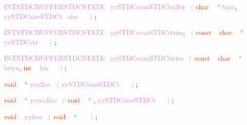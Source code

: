 \documentclass[8, usernames, dvipsnames]{beamer}
\begin{document}
\begin{frame}

 \textcolor{Violet}{INTSTDCBUFFERSTDCSTATE}\textcolor{White}{\ }
\textcolor{Violet}{yySTDCscanSTDCbuffer}\textcolor{White}{\ }
\textcolor{SkyBlue}{(}
\textcolor{OrangeRed}{char}
\textcolor{White}{\ }
\textcolor{SpringGreen}{*}
\textcolor{Violet}{base}\textcolor{Sepia}{,}
\textcolor{Violet}{yySTDCsizeSTDCt}\textcolor{White}{\ }
\textcolor{Violet}{size}\textcolor{White}{\ }
\textcolor{White}{\ }
\textcolor{SkyBlue}{)}
\textcolor{Sepia}{;}

 \textcolor{Violet}{INTSTDCBUFFERSTDCSTATE}\textcolor{White}{\ }
\textcolor{Violet}{yySTDCscanSTDCstring}\textcolor{White}{\ }
\textcolor{SkyBlue}{(}
\textcolor{OrangeRed}{const}
\textcolor{White}{\ }
\textcolor{OrangeRed}{char}
\textcolor{White}{\ }
\textcolor{SpringGreen}{*}
\textcolor{Violet}{yySTDCstr}\textcolor{White}{\ }
\textcolor{White}{\ }
\textcolor{SkyBlue}{)}
\textcolor{Sepia}{;}

 \textcolor{Violet}{INTSTDCBUFFERSTDCSTATE}\textcolor{White}{\ }
\textcolor{Violet}{yySTDCscanSTDCbytes}\textcolor{White}{\ }
\textcolor{SkyBlue}{(}
\textcolor{OrangeRed}{const}
\textcolor{White}{\ }
\textcolor{OrangeRed}{char}
\textcolor{White}{\ }
\textcolor{SpringGreen}{*}
\textcolor{Violet}{bytes}\textcolor{Sepia}{,}
\textcolor{OrangeRed}{int}
\textcolor{White}{\ }
\textcolor{Violet}{len}\textcolor{White}{\ }
\textcolor{White}{\ }
\textcolor{SkyBlue}{)}
\textcolor{Sepia}{;}

 
 \textcolor{OrangeRed}{void}
\textcolor{White}{\ }
\textcolor{SpringGreen}{*}
\textcolor{Violet}{yyalloc}\textcolor{White}{\ }
\textcolor{SkyBlue}{(}
\textcolor{Violet}{yySTDCsizeSTDCt}\textcolor{White}{\ }
\textcolor{White}{\ }
\textcolor{SkyBlue}{)}
\textcolor{Sepia}{;}

 \textcolor{OrangeRed}{void}
\textcolor{White}{\ }
\textcolor{SpringGreen}{*}
\textcolor{Violet}{yyrealloc}\textcolor{White}{\ }
\textcolor{SkyBlue}{(}
\textcolor{OrangeRed}{void}
\textcolor{White}{\ }
\textcolor{SpringGreen}{*}
\textcolor{Sepia}{,}
\textcolor{Violet}{yySTDCsizeSTDCt}\textcolor{White}{\ }
\textcolor{White}{\ }
\textcolor{SkyBlue}{)}
\textcolor{Sepia}{;}

 \textcolor{OrangeRed}{void}
\textcolor{White}{\ }
\textcolor{Violet}{yyfree}\textcolor{White}{\ }
\textcolor{SkyBlue}{(}
\textcolor{OrangeRed}{void}
\textcolor{White}{\ }
\textcolor{SpringGreen}{*}
\textcolor{White}{\ }
\textcolor{White}{\ }
\textcolor{SkyBlue}{)}
\textcolor{Sepia}{;}

 
 
 \end{frame}
\end{document}
